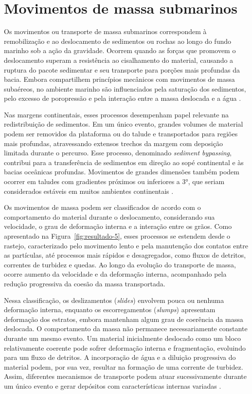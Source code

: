 \section{Movimentos de massa submarinos}\label{sec:2-3}

Os movimentos ou transporte de massa submarinos correspondem à remobilização e ao deslocamento de sedimentos ou rochas ao longo do fundo marinho sob a ação da gravidade. Ocorrem quando as forças que promovem o deslocamento superam a resistência ao cisalhamento do material, causando a ruptura do pacote sedimentar e seu transporte para porções mais profundas da bacia. Embora compartilhem princípios mecânicos com movimentos de massa subaéreos, no ambiente marinho são influenciados pela saturação dos sedimentos, pelo excesso de poropressão e pela interação entre a massa deslocada e a água \cite{hampton1996}.

Nas margens continentais, esses processos desempenham papel relevante na redistribuição de sedimentos. Em um único evento, grandes volumes de material podem ser removidos da plataforma ou do talude e transportados para regiões mais profundas, atravessando extensos trechos da margem com deposição limitada durante o percurso. Esse processo, denominado \textit{sediment bypassing}, contribui para a transferência de sedimentos em direção ao sopé continental e às bacias oceânicas profundas. Movimentos de grandes dimensões também podem ocorrer em taludes com gradientes próximos ou inferiores a 3°, que seriam considerados estáveis em muitos ambientes continentais \cite{hampton1996,talling2014}.

Os movimentos de massa podem ser classificados de acordo com o comportamento do material durante o deslocamento, considerando sua velocidade, o grau de deformação interna e a interação entre os grãos. Como apresentado na Figura~\ref{fig:resultado-5}, esses processos se estendem desde o rastejo, caracterizado pelo movimento lento e pela manutenção dos contatos entre as partículas, até processos mais rápidos e desagregados, como fluxos de detritos, correntes de turbidez e quedas. Ao longo da evolução do transporte de massa, ocorre aumento da velocidade e da deformação interna, acompanhado pela redução progressiva da coesão da massa transportada.

Nessa classificação, os deslizamentos (\textit{slides}) envolvem pouca ou nenhuma deformação interna, enquanto os escorregamentos (\textit{slumps}) apresentam deformação dos estratos, embora mantenham algum grau de coerência da massa deslocada. O comportamento da massa não permanece necessariamente constante durante um mesmo evento. Um material inicialmente deslocado como um bloco relativamente coerente pode sofrer deformação interna e fragmentação, evoluindo para um fluxo de detritos. A incorporação de água e a diluição progressiva do material podem, por sua vez, resultar na formação de uma corrente de turbidez. Assim, diferentes mecanismos de transporte podem atuar sucessivamente durante um único evento e gerar depósitos com características internas variadas \cite{posamentier2011,scarselli2020}.


